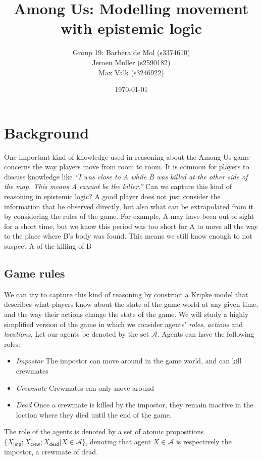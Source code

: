 \documentclass[a4paper]{scrartcl}
\title{Among Us: Modelling movement with epistemic logic}
\author{Group 19: Barbera de Mol (s3374610)\\
Jeroen Muller (s2590182) \\
Max Valk (s3246922)
}
\date{\today}
\begin{document}
\maketitle

\section*{Background}
One important kind of knowledge used in reasoning about the Among Us game concerns the way players move from room to room. It is common for players to discuss knowledge like \emph{``I was close to A while B was killed at the other side of the map. This means A cannot be the killer.''} Can we capture this kind of reasoning in epistemic logic? A good player does not just consider the information that he observed directly, but also what can be extrapolated from it by considering the rules of the game. For example, A may have been out of sight for a short time, but we know this period was too short for A to move all the way to the place where B's body was found. This means we still know enough to not suspect A of the killing of B

\subsection*{Game rules}
We can try to capture this kind of reasoning by construct a Kripke model that describes what players know about the state of the game world at any given time, and the way their actions change the state of the game. We will study a highly simplified version of the game in which we consider agents' \emph{roles}, \emph{actions} and \emph{locations}. Let our agents be denoted by the set $\mathcal{A}$. Agents can have the following roles:

\begin{itemize}
\item \emph{Impostor} The impostor can move around in the game world, and can kill crewmates
\item \emph{Crewmate} Crewmates can only move around
\item \emph{Dead} Once a crewmate is killed by the impostor, they remain inactive in the loction where they died until the end of the game.
\end{itemize}

The role of the agents is denoted by a set of atomic propositions $\{X_\mathsf{imp};X_\mathsf{crew};X_\mathsf{dead} | X \in \mathcal{A}\}$, denoting that agent $X \in \mathcal{A}$ is respectively the impostor, a crewmate of dead. 
\end{document}
